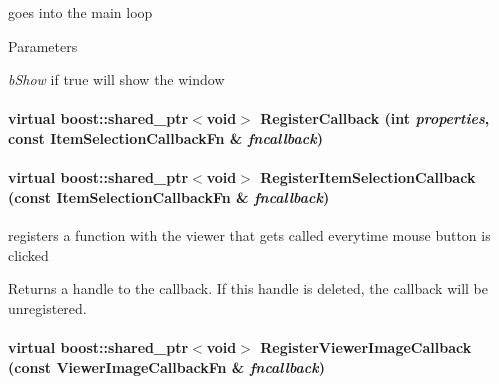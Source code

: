 goes into the main loop 


\begin{DoxyParams}{Parameters}
\item[{\em bShow}]if true will show the window \end{DoxyParams}
\hypertarget{classOpenRAVE_1_1ViewerBase_a87bb8fc16f70e17fc3955a734a5a9cc5}{
\paragraph[{RegisterCallback}]{\setlength{\rightskip}{0pt plus 5cm}virtual boost::shared\_\-ptr$<$void$>$ RegisterCallback (int {\em properties}, \/  const {\bf ItemSelectionCallbackFn} \& {\em fncallback})}\hfill}
\label{classOpenRAVE_1_1ViewerBase_a87bb8fc16f70e17fc3955a734a5a9cc5}
\hypertarget{classOpenRAVE_1_1ViewerBase_a22844e2b6584a0673cc82cfd7e2fa01d}{
\paragraph[{RegisterItemSelectionCallback}]{\setlength{\rightskip}{0pt plus 5cm}virtual boost::shared\_\-ptr$<$void$>$ RegisterItemSelectionCallback (const {\bf ItemSelectionCallbackFn} \& {\em fncallback})}\hfill}
\label{classOpenRAVE_1_1ViewerBase_a22844e2b6584a0673cc82cfd7e2fa01d}


registers a function with the viewer that gets called everytime mouse button is clicked 

\begin{DoxyReturn}{Returns}
a handle to the callback. If this handle is deleted, the callback will be unregistered. 
\end{DoxyReturn}
\hypertarget{classOpenRAVE_1_1ViewerBase_ad23099fd4b95a0b7587ec4efe5454043}{
\paragraph[{RegisterViewerImageCallback}]{\setlength{\rightskip}{0pt plus 5cm}virtual boost::shared\_\-ptr$<$void$>$ RegisterViewerImageCallback (const {\bf ViewerImageCallbackFn} \& {\em fncallback})}\hfill}
\label{classOpenRAVE_1_1ViewerBase_ad23099fd4b95a0b7587ec4efe5454043}


